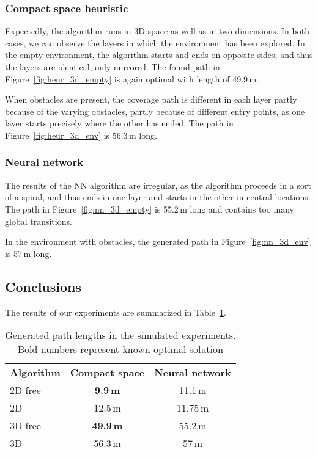 \documentclass[buriama8_dp.tex]{subfiles}
\begin{document}
\subsubsection{Compact space heuristic}
Expectedly, the algorithm runs in 3D space as well as in two dimensions. In both cases, we can observe the layers in which the environment has been explored. In the empty environment, the algorithm starts and ends on opposite sides, and thus the layers are identical, only mirrored. The found path in Figure~\ref{fig:heur_3d_empty} is again optimal with length of 49.9\,m.

When obstacles are present, the coverage path is different in each layer partly because of the varying obstacles, partly because of different entry points, as one layer starts precisely where the other has ended. The path in Figure~\ref{fig:heur_3d_env} is 56.3\,m long.

\subsubsection{Neural network}
The results of the NN algorithm are irregular, as the algorithm proceeds in a sort of a spiral, and thus ends in one layer and starts in the other in central locations. The path in Figure~\ref{fig:nn_3d_empty} is 55.2\,m long and contains too many global transitions.

In the environment with obstacles, the generated path in Figure~\ref{fig:nn_3d_env} is 57\,m long.


\subsection{Conclusions}
\label{subsec:alg_concl}

The results of our experiments are summarized in Table~\ref{tab:len}.

\begin{table}
\begin{ctucolortab}
\begin{tabular}{l|cc}
\bfseries Algorithm & \bfseries Compact space & \bfseries Neural network \\\Midrule
2D free & \textbf{9.9\,m} & 11.1\,m\\
2D & 12.5\,m & 11.75\,m\\
3D free & \textbf{49.9\,m} & 55.2\,m\\
3D & 56.3\,m & 57\,m
\end{tabular}
\end{ctucolortab}
\caption{Generated path lengths in the simulated experiments. Bold numbers represent known optimal solution}
\label{tab:len}
\end{table}
\end{document}
